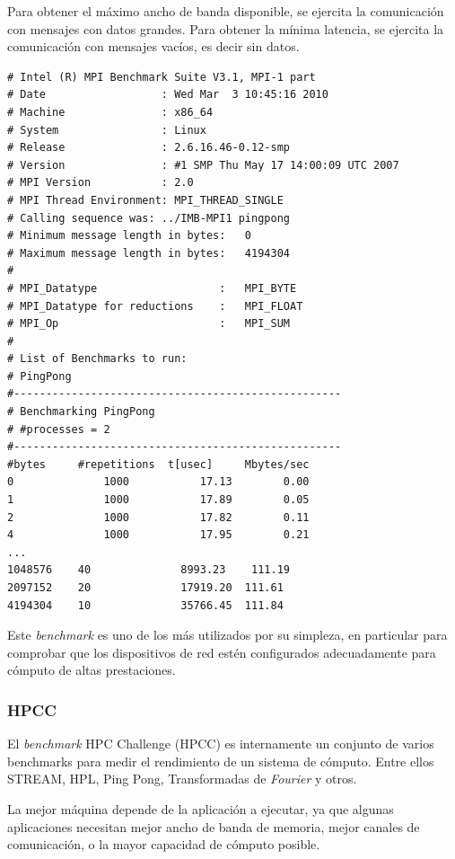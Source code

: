 \documentclass[a4paper]{report}
\begin{document}
\bigskip

Para obtener el m\'aximo ancho de banda disponible, se ejercita la comunicaci\'on con mensajes con datos grandes.
Para obtener la m\'inima latencia, se ejercita la comunicaci\'on con mensajes vac\'ios, es decir sin datos.

\begin{verbatim}
# Intel (R) MPI Benchmark Suite V3.1, MPI-1 part
# Date                  : Wed Mar  3 10:45:16 2010
# Machine               : x86_64
# System                : Linux
# Release               : 2.6.16.46-0.12-smp
# Version               : #1 SMP Thu May 17 14:00:09 UTC 2007
# MPI Version           : 2.0
# MPI Thread Environment: MPI_THREAD_SINGLE
# Calling sequence was: ../IMB-MPI1 pingpong
# Minimum message length in bytes:   0
# Maximum message length in bytes:   4194304
#
# MPI_Datatype                   :   MPI_BYTE
# MPI_Datatype for reductions    :   MPI_FLOAT
# MPI_Op                         :   MPI_SUM
#
# List of Benchmarks to run:
# PingPong
#---------------------------------------------------
# Benchmarking PingPong
# #processes = 2
#---------------------------------------------------
#bytes     #repetitions  t[usec]     Mbytes/sec
0              1000           17.13        0.00
1              1000           17.89        0.05
2              1000           17.82        0.11
4              1000           17.95        0.21
...
1048576    40              8993.23    111.19
2097152    20              17919.20  111.61
4194304    10              35766.45  111.84
\end{verbatim}

Este {\it benchmark} es uno de los m\'as utilizados por su simpleza, 
en particular para comprobar que los dispositivos de red est\'en configurados adecuadamente para c\'omputo
de altas prestaciones.

\subsubsection{HPCC}

El {\it benchmark} HPC Challenge \cite{hpcc} (HPCC) es internamente un conjunto de
varios benchmarks para medir el rendimiento de un sistema de
c\'omputo. Entre ellos STREAM, HPL, Ping Pong, Transformadas de {\it Fourier}
y otros.

\bigskip

La mejor m\'aquina depende de la aplicaci\'on a ejecutar, ya que algunas aplicaciones
necesitan mejor ancho de banda de memoria, mejor canales de comunicaci\'on, o
la mayor capacidad de c\'omputo posible.
\end{document}
